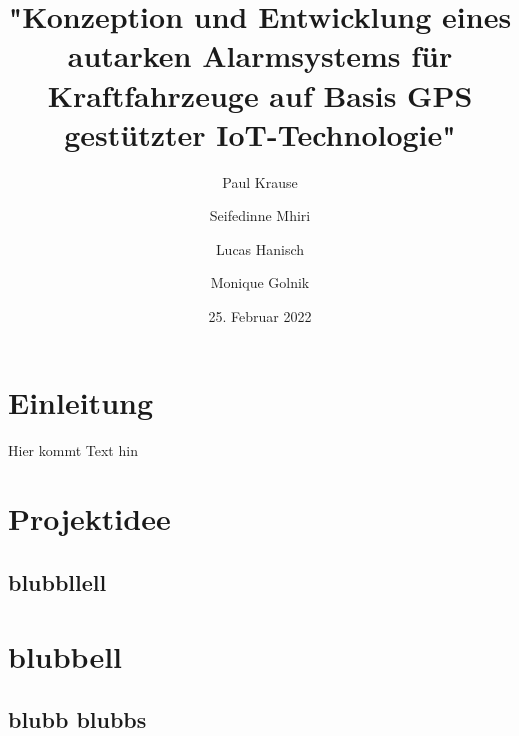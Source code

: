 \documentclass[11pt,a4paper,ngerman]{report}
\date{25. Februar 2022}
\title{"Konzeption und Entwicklung eines autarken Alarmsystems für Kraftfahrzeuge auf Basis GPS gestützter IoT-Technologie"}
\author{Paul Krause \and Seifedinne Mhiri \and Lucas Hanisch \and Monique Golnik}
\begin{document}
	\maketitle
	\tableofcontents
	
	\chapter{Einleitung}
	
	Hier kommt Text hin
	
	
	\chapter{Projektidee}
  		\section{blubbllell}
	
	
	
	\chapter{blubbell}
		\section{blubb blubbs}
	
	
	
\end{document}
